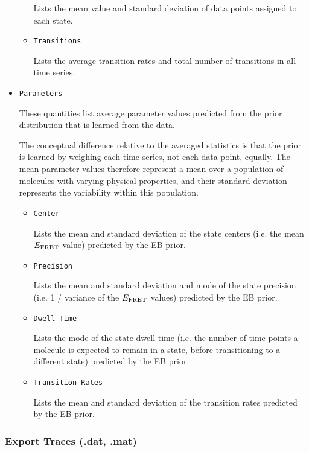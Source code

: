\documentclass[12pt,article,oldfontcommands]{memoir}
\begin{document}
\begin{itemize}
\begin{itemize}
Lists the mean value and standard deviation of data points assigned to each state.

\item \texttt{Transitions}

Lists the average transition rates and total number of transitions in all time series.
\end{itemize}


\item \texttt{Parameters}

These quantities list average parameter values predicted from the prior distribution that is learned from the data. 

The conceptual difference relative to the averaged statistics is that the prior is learned by weighing each time series, not each data point, equally. The mean parameter values therefore represent a mean over a population of molecules with varying physical properties, and their standard deviation represents the variability within this population.

\begin{itemize}
\item \texttt{Center}

Lists the mean and standard deviation of the state centers (i.e. the mean $E_{\rm FRET}$ value) predicted by the EB prior.

\item \texttt{Precision}

Lists the mean and standard deviation and mode of the state precision (i.e. 1 / variance of the $E_{\rm FRET}$ values) predicted by the EB prior.

\item \texttt{Dwell Time}

Lists the mode of the state dwell time (i.e. the number of time points a molecule is expected to remain in a state, before transitioning to a different state) predicted by the EB prior.

\item \texttt{Transition Rates}

Lists the mean and standard deviation of the transition rates predicted by the EB prior.


\end{itemize}

\end{itemize}

\subsubsection{Export Traces (.dat, .mat)}
\end{document}
